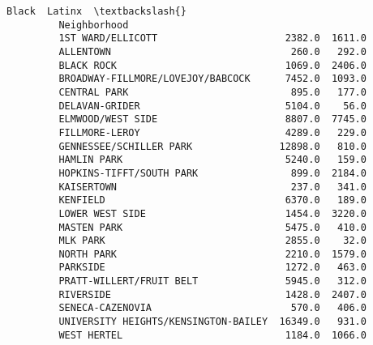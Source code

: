 \documentclass[11pt]{article}
\begin{document}
\begin{Verbatim}[commandchars=\\\{\}]
                                                 Black  Latinx  \textbackslash{}
         Neighborhood                                            
         1ST WARD/ELLICOTT                      2382.0  1611.0   
         ALLENTOWN                               260.0   292.0   
         BLACK ROCK                             1069.0  2406.0   
         BROADWAY-FILLMORE/LOVEJOY/BABCOCK      7452.0  1093.0   
         CENTRAL PARK                            895.0   177.0   
         DELAVAN-GRIDER                         5104.0    56.0   
         ELMWOOD/WEST SIDE                      8807.0  7745.0   
         FILLMORE-LEROY                         4289.0   229.0   
         GENNESSEE/SCHILLER PARK               12898.0   810.0   
         HAMLIN PARK                            5240.0   159.0   
         HOPKINS-TIFFT/SOUTH PARK                899.0  2184.0   
         KAISERTOWN                              237.0   341.0   
         KENFIELD                               6370.0   189.0   
         LOWER WEST SIDE                        1454.0  3220.0   
         MASTEN PARK                            5475.0   410.0   
         MLK PARK                               2855.0    32.0   
         NORTH PARK                             2210.0  1579.0   
         PARKSIDE                               1272.0   463.0   
         PRATT-WILLERT/FRUIT BELT               5945.0   312.0   
         RIVERSIDE                              1428.0  2407.0   
         SENECA-CAZENOVIA                        570.0   406.0   
         UNIVERSITY HEIGHTS/KENSINGTON-BAILEY  16349.0   931.0   
         WEST HERTEL                            1184.0  1066.0   
         

\end{Verbatim}
\end{document}
